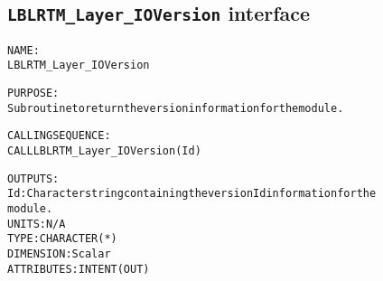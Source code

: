 \subsection{\texttt{LBLRTM\_Layer\_IOVersion} interface}
  \label{sec:LBLRTM_Layer_IOVersion_interface}
  \begin{alltt}
 
  NAME:
        LBLRTM_Layer_IOVersion
 
  PURPOSE:
        Subroutine to return the version information for the module.
 
  CALLING SEQUENCE:
        CALL LBLRTM_Layer_IOVersion( Id )
 
  OUTPUTS:
        Id:     Character string containing the version Id information for the
                module.
                UNITS:      N/A
                TYPE:       CHARACTER(*)
                DIMENSION:  Scalar
                ATTRIBUTES: INTENT(OUT)
 
  \end{alltt}
